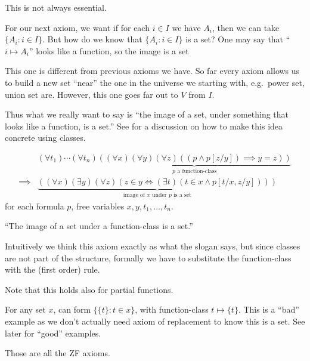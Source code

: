 \documentclass[a4paper]{article}
\begin{document}
This is not always essential.

For our next axiom, we want if for each \(i \in I\) we have \(A_i\), then we can take \(\{A_i: i \in I\}\). But how do we know that \(\{A_i: i \in I\}\) is a set?
One may say that ``\(i \mapsto A_i\)'' looks like a function, so the image is a set

This one is different from previous axioms we have. So far every axiom allows us to build a new set ``near'' the one in the universe we starting with, e.g.\ power set, union set are. However, this one goes far out to \(V\) from \(I\).

Thus what we really want to say is ``the image of a set, under something that looks like a function, is a set.'' See  for a discussion on how to make this idea concrete using classes.

\begin{axiom*}
  \begin{align*}
    & (\forall t_1) \cdots (\forall t_n) \underbrace{((\forall x) (\forall y) (\forall z) ((p \land p[z/y]) \implies y = z))}_{p \text{ a function-class}} \\
    \implies & \underbrace{((\forall x) (\exists y) (\forall z) (z \in y \iff (\exists t) (t \in x \land p[t/x, z/y])))}_{\text{image of \(x\) under \(p\) is a set}}
  \end{align*}
  for each formula \(p\), free variables \(x, y, t_1, \dots, t_n\).
\end{axiom*}
``The image of a set under a function-class is a set.''

Intuitively we think this axiom exactly as what the slogan says, but since classes are not part of the structure, formally we have to substitute the function-class with the (first order) rule.

Note that this holds also for partial functions.

\begin{eg}
  For any set \(x\), can form \(\{\{t\}: t \in x\}\), with function-class \(t \mapsto \{t\}\). This is a ``bad'' example as we don't actually need axiom of replacement to know this is a set. See later for ``good'' examples.
\end{eg}

Those are all the ZF axioms.
\end{document}
